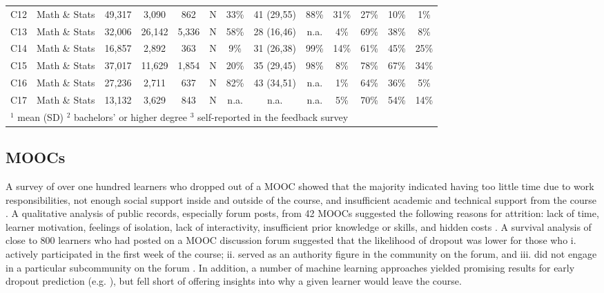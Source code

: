\documentclass{sigchi}\usepackage[]{graphicx}\usepackage[]{color}
\begin{document}
\begin{table}[th]
\begin{tabular}{llccccccccccc}
C12 & Math \& Stats & 49,317 & 3,090 & 862   & N    & 33\%   & 41 (29,55) & 88\%       & 31\% & 27\% & 10\% & 1\% \\
C13 & Math \& Stats & 32,006 & 26,142 & 5,336 & N   & 58\%   & 28 (16,46) & n.a.       & 4\%  & 69\% & 38\% & 8\% \\
C14 & Math \& Stats & 16,857 & 2,892 & 363   & N    & 9\%    & 31 (26,38) & 99\%       & 14\% & 61\% & 45\% & 25\% \\
C15 & Math \& Stats & 37,017 & 11,629 & 1,854 & N   & 20\%   & 35 (29,45) & 98\%       & 8\%  & 78\% & 67\% & 34\% \\
C16 & Math \& Stats & 27,236 & 2,711 & 637   & N    & 82\%   & 43 (34,51) & n.a.       & 1\%  & 64\% & 36\% & 5\% \\
C17 & Math \& Stats & 13,132 & 3,629 & 843   & N    & n.a.   & n.a.       & n.a.       & 5\%  & 70\% & 54\% & 14\% \\
\bottomrule
\multicolumn{13}{l}{$^1$ mean (SD)  $^2$ bachelors' or higher degree  $^3$ self-reported in the feedback survey}
\end{tabular}
\end{table}

\subsection{MOOCs}

A survey of over one hundred learners who dropped out of a MOOC showed that the majority indicated having too little time due to work responsibilities, not enough social support inside and outside of the course, and insufficient academic and technical support from the course \cite{gutl2014attrition}. A qualitative analysis of public records, especially forum posts, from 42 MOOCs suggested the following reasons for attrition: lack of time, learner motivation, feelings of isolation, lack of interactivity, insufficient prior knowledge or skills, and hidden costs \cite{khalil2014moocs}. A survival analysis of close to 800 learners who had posted on a MOOC discussion forum suggested that the likelihood of dropout was lower for those who i. actively participated in the first week of the course; ii. served as an authority figure in the community on the forum, and iii. did not engage in a particular subcommunity on the forum \cite{yang2013turn}. In addition, a number of machine learning approaches yielded promising results for early dropout prediction (e.g. \cite{taylor2014likely,halawa2014dropout}), but fell short of offering insights into why a given learner would leave the course.
\end{document}
